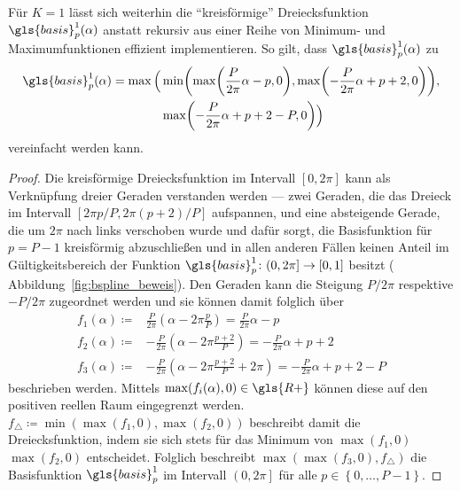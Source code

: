 

Für $K=1$ lässt sich weiterhin die \enquote{kreisförmige} Dreiecksfunktion $\gls{basis}_p^1\left(\alpha\right)$ anstatt rekursiv aus einer Reihe von Minimum- und Maximumfunktionen effizient implementieren.
So gilt, dass $\gls{basis}_p^1\left(\alpha\right)$ zu
\begin{equation*}
  \begin{split}
    \gls{basis}_p^1\left(\alpha\right) = \max \Big( & \min \left( \max\left(\frac{P}{2\pi}\alpha - p, 0\right), \max\left(-\frac{P}{2\pi}\alpha + p + 2, 0\right)\right),\\
    & \max\left(-\frac{P}{2\pi}\alpha + p + 2 - P, 0\right) \Big)
  \end{split}
\end{equation*}
vereinfacht werden kann.
\begin{proof}
  Die kreisförmige Dreiecksfunktion im Intervall $\left[0, 2\pi\right]$ kann als Verknüpfung dreier Geraden verstanden werden — zwei Geraden, die das Dreieck im Intervall $\left[2\pi p/P, 2\pi \left(p+2\right)/P\right]$ aufspannen, und eine absteigende Gerade, die um $2\pi$ nach links verschoben wurde und dafür sorgt, die Basisfunktion für $p=P-1$ kreisförmig abzuschließen und in allen anderen Fällen keinen Anteil im Gültigkeitsbereich der Funktion $\gls{basis}_p^1 \colon \left(0,2\pi\right] \to \left[0,1\right]$ besitzt (\vgl{} Abbildung~\ref{fig:bspline_beweis}).
Den Geraden kann die Steigung $P/2\pi$ respektive $-P/2\pi$ zugeordnet werden und sie können damit folglich über
\begin{equation*}
  \begin{split}
    f_1\left(\alpha\right) \coloneqq & \frac{P}{2\pi}\left(\alpha - 2\pi\frac{p}{P}\right) = \frac{P}{2\pi}\alpha - p\\
    f_2\left(\alpha\right) \coloneqq & - \frac{P}{2\pi}\left(\alpha - 2\pi\frac{p+2}{P}\right) = - \frac{P}{2\pi}\alpha + p + 2\\
    f_3\left(\alpha\right) \coloneqq & - \frac{P}{2\pi}\left(\alpha - 2\pi\frac{p+2}{P} + 2\pi\right) = - \frac{P}{2\pi}\alpha + p + 2 - P
  \end{split}
\end{equation*}
beschrieben werden.
Mittels $\max\left(f_i\left(\alpha\right), 0\right) \in \gls{R+}$ können diese auf den positiven reellen Raum eingegrenzt werden.
  $f_{\triangle} \coloneqq \min\left(\max\left(f_1, 0\right), \max\left(f_2, 0\right)\right)$ beschreibt damit die Dreiecksfunktion, indem sie sich stets für das Minimum von $\max\left(f_1, 0\right)$ \bzw{} $\max\left(f_2,0\right)$ entscheidet.
  Folglich beschreibt $\max\left(\max\left(f_3,0\right), f_{\triangle}\right)$ die Basisfunktion $\gls{basis}_p^1$ im Intervall $\left(0, 2\pi\right]$ für alle $p \in \left\{0, \ldots, P-1\right\}$.
\end{proof}

